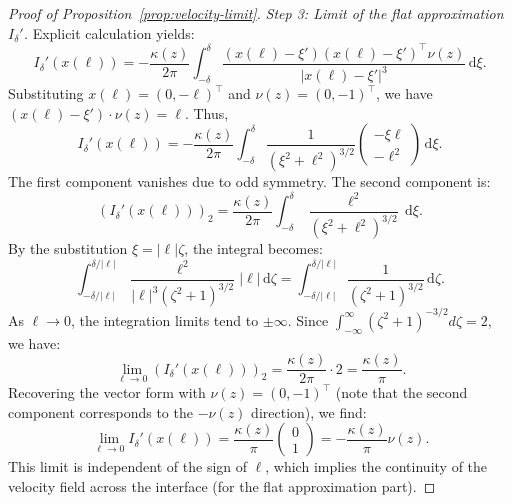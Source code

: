 \documentclass{article}
\theoremstyle{remark}
\theoremstyle{definition}
\numberwithin{equation}{section}
\begin{document}
\begin{proof}[Proof of Proposition~\ref{prop:velocity-limit}]
    \textit{Step 3: Limit of the flat approximation $I_\delta'$.}
    Explicit calculation yields:
    \begin{equation*}
        I_\delta'(x(\ell))
        = -\frac{\kappa(z)}{2\pi} \int_{-\delta}^\delta \frac{(x(\ell) - \xi') (x(\ell) - \xi')^\top \nu(z)}{|x(\ell) - \xi'|^3} \, \mathrm{d}\xi.
    \end{equation*}
    Substituting $x(\ell)=(0,-\ell)^\top$ and $\nu(z)=(0,-1)^\top$, we have $(x(\ell) - \xi') \cdot \nu(z) = \ell$. Thus,
    \begin{equation*}
        I_\delta'(x(\ell)) = -\frac{\kappa(z)}{2\pi} \int_{-\delta}^\delta \frac{1}{(\xi^2 + \ell^2)^{3/2}} \begin{pmatrix} -\xi \ell \\ -\ell^2 \end{pmatrix} \, \mathrm{d}\xi.
    \end{equation*}
    The first component vanishes due to odd symmetry. The second component is:
    \begin{equation*}
        (I_\delta'(x(\ell)))_2 = \frac{\kappa(z)}{2\pi} \int_{-\delta}^\delta \frac{\ell^2}{(\xi^2 + \ell^2)^{3/2}} \, \mathrm{d}\xi.
    \end{equation*}
    By the substitution $\xi = |\ell| \zeta$, the integral becomes:
    \begin{equation*}
        \int_{-\delta/|\ell|}^{\delta/|\ell|} \frac{\ell^2}{|\ell|^3 (\zeta^2 + 1)^{3/2}} |\ell| \, \mathrm{d}\zeta = \int_{-\delta/|\ell|}^{\delta/|\ell|} \frac{1}{(\zeta^2 + 1)^{3/2}} \, \mathrm{d}\zeta.
    \end{equation*}
    As $\ell \to 0$, the integration limits tend to $\pm \infty$. Since $\int_{-\infty}^\infty (\zeta^2+1)^{-3/2} d\zeta = 2$, we have:
    \begin{equation*}
        \lim_{\ell \to 0} (I_\delta'(x(\ell)))_2 = \frac{\kappa(z)}{2\pi} \cdot 2 = \frac{\kappa(z)}{\pi}.
    \end{equation*}
    Recovering the vector form with $\nu(z)=(0,-1)^\top$ (note that the second component corresponds to the $-\nu(z)$ direction), we find:
    \begin{equation}
        \lim_{\ell \to 0} I_\delta'(x(\ell)) = \frac{\kappa(z)}{\pi} \begin{pmatrix} 0 \\ 1 \end{pmatrix} = -\frac{\kappa(z)}{\pi} \nu(z).
        \label{eq:limit_Idp}
    \end{equation}
    This limit is independent of the sign of $\ell$, which implies the continuity of the velocity field across the interface (for the flat approximation part).


\end{proof}
\end{document}

